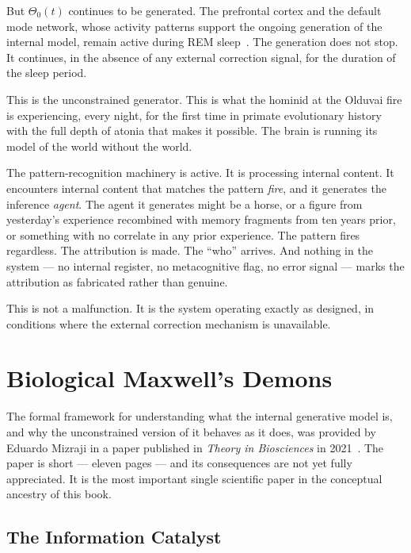 But $\Theta_0(t)$ continues to be generated. The prefrontal cortex and the default mode network, whose activity patterns support the ongoing generation of the internal model, remain active during REM sleep~\cite{hobson1977}. The generation does not stop. It continues, in the absence of any external correction signal, for the duration of the sleep period.

This is the unconstrained generator. This is what the hominid at the Olduvai fire is experiencing, every night, for the first time in primate evolutionary history with the full depth of atonia that makes it possible. The brain is running its model of the world without the world.

The pattern-recognition machinery is active. It is processing internal content. It encounters internal content that matches the pattern \textit{fire}, and it generates the inference \textit{agent}. The agent it generates might be a horse, or a figure from yesterday's experience recombined with memory fragments from ten years prior, or something with no correlate in any prior experience. The pattern fires regardless. The attribution is made. The ``who'' arrives. And nothing in the system --- no internal register, no metacognitive flag, no error signal --- marks the attribution as fabricated rather than genuine.

This is not a malfunction. It is the system operating exactly as designed, in conditions where the external correction mechanism is unavailable.

\bigskip

\section{Biological Maxwell's Demons}

The formal framework for understanding what the internal generative model is, and why the unconstrained version of it behaves as it does, was provided by Eduardo Mizraji in a paper published in \textit{Theory in Biosciences} in 2021~\cite{mizraji2021}. The paper is short --- eleven pages --- and its consequences are not yet fully appreciated. It is the most important single scientific paper in the conceptual ancestry of this book.

\subsection{The Information Catalyst}

